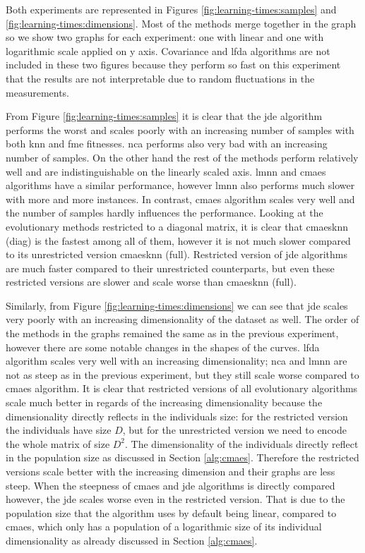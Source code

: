 \documentclass[12pt,a4paper]{report}
\begin{document}
Both experiments are represented in Figures \ref{fig:learning-times:samples} and \ref{fig:learning-times:dimensions}. Most of the methods merge together in the graph so we show two graphs for each experiment: one with linear and one with logarithmic scale applied on y axis. Covariance and \ac{lfda} algorithms are not included in these two figures because they perform so fast on this experiment that the results are not interpretable due to random fluctuations in the measurements.

From Figure \ref{fig:learning-times:samples} it is clear that the \ac{jde} algorithm performs the worst and scales poorly with an increasing number of samples with both \ac{knn} and \ac{fme} fitnesses. \ac{nca} performs also very bad with an increasing number of samples. On the other hand the rest of the methods perform relatively well and are indistinguishable on the linearly scaled axis. \ac{lmnn} and \ac{cmaes} algorithms have a similar performance, however \ac{lmnn} also performs much slower with more and more instances. In contrast, \ac{cmaes} algorithm scales very well and the number of samples hardly influences the performance. Looking at the evolutionary methods restricted to a diagonal matrix, it is clear that \ac{cmaesknn} (diag) is the fastest among all of them, however it is not much slower compared to its unrestricted version \ac{cmaesknn} (full). Restricted version of \ac{jde} algorithms are much faster compared to their unrestricted counterparts, but even these restricted versions are slower and scale worse than \ac{cmaesknn} (full).


Similarly, from Figure \ref{fig:learning-times:dimensions} we can see that \ac{jde} scales very poorly with an increasing dimensionality of the dataset as well. The order of the methods in the graphs remained the same as in the previous experiment, however there are some notable changes in the shapes of the curves. \ac{lfda} algorithm scales very well with an increasing dimensionality; \ac{nca} and \ac{lmnn} are not as steep as in the previous experiment, but they still scale worse compared to \ac{cmaes} algorithm. It is clear that restricted versions of all evolutionary algorithms scale much better in regards of the increasing dimensionality because the dimensionality directly reflects in the individuals size: for the restricted version the individuals have size $D$, but for the unrestricted version we need to encode the whole matrix of size $D^2$. The dimensionality of the individuals directly reflect in the population size as discussed in Section \ref{alg:cmaes}. Therefore the restricted versions scale better with the increasing dimension and their graphs are less steep. When the steepness of \ac{cmaes} and \ac{jde} algorithms is directly compared however, the \ac{jde} scales worse even in the restricted version. That is due to the population size that the algorithm uses by default being linear, compared to \ac{cmaes}, which only has a population of a logarithmic size of its individual dimensionality as already discussed in Section \ref{alg:cmaes}.
\end{document}

